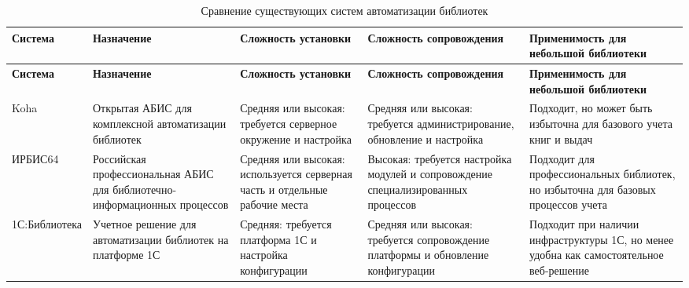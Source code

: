 {
\coursetablesetup
\setlength{\LTleft}{0pt}
\setlength{\LTright}{0pt}

\begin{longtable}{|
p{}|
p{}|
p{}|
p{}|
p{}|}
    \caption{Сравнение существующих систем автоматизации библиотек}
    \label{tab:competitors_library} \\

    \hline
    \textbf{Система} &
    \textbf{Назначение} &
    \textbf{Сложность установки} &
    \textbf{Сложность сопровождения} &
    \textbf{Применимость для небольшой библиотеки} \\ \hline
    \endfirsthead

    \tabcont{\ref{tab:competitors_library}}
    \textbf{Система} &
    \textbf{Назначение} &
    \textbf{Сложность установки} &
    \textbf{Сложность сопровождения} &
    \textbf{Применимость для небольшой библиотеки} \\ \hline
    \endhead

    \hline
    \endfoot

    Koha &
    Открытая АБИС для комплексной автоматизации библиотек &
    Средняя или высокая: требуется серверное окружение и настройка &
    Средняя или высокая: требуется администрирование, обновление и настройка &
    Подходит, но может быть избыточна для базового учета книг и выдач \\ \hline

    ИРБИС64 &
    Российская профессиональная АБИС для библиотечно-информационных процессов &
    Средняя или высокая: используется серверная часть и отдельные рабочие места &
    Высокая: требуется настройка модулей и сопровождение специализированных процессов &
    Подходит для профессиональных библиотек, но избыточна для базовых процессов учета \\ \hline

    1С:Биб\-лио\-тека &
    Учетное решение для автоматизации библиотек на платформе 1С &
    Средняя: требуется платформа 1С и настройка конфигурации &
    Средняя или высокая: требуется сопровождение платформы и обновление конфигурации &
    Подходит при наличии инфраструктуры 1С, но менее удобна как самостоятельное веб-решение \\ \hline
\end{longtable}
}


